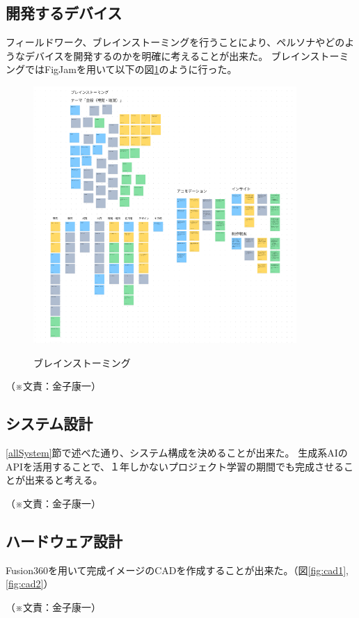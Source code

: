 \documentclass[11pt,a4paper]{report}
\newcommand{\Writer}[1]{
  \normalsize
  \begin{flushright}
    （※文責：#1）
  \end{flushright}
}
\begin{document}
\subsection{開発するデバイス}
\noindent\space
フィールドワーク、ブレインストーミングを行うことにより、ペルソナやどのようなデバイスを開発するのかを明確に考えることが出来た。
ブレインストーミングではFigJamを用いて以下の図\ref{fig:figjam}のように行った。
\begin{figure}[htbp]
  \centering %
  \includegraphics[width=100mm]{images/figjam.png}\\
  \caption{ブレインストーミング}
  \label{fig:figjam}
\end{figure}
\Writer{金子康一}

\subsection{システム設計}
\noindent\space
\ref{allSystem}節で述べた通り、システム構成を決めることが出来た。
生成系AIのAPIを活用することで、１年しかないプロジェクト学習の期間でも完成させることが出来ると考える。
\Writer{金子康一}

\subsection{ハードウェア設計}
\noindent\space
Fusion360を用いて完成イメージのCADを作成することが出来た。（図\ref{fig:cad1}, \ref{fig:cad2}）
\Writer{金子康一}
\end{document}
